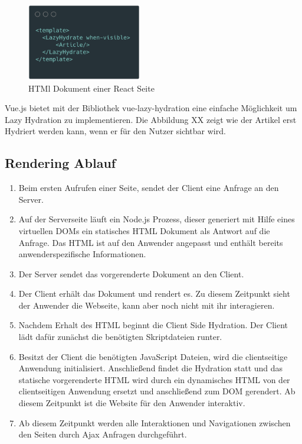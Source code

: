 \documentclass[runningheads]{llncs}
\begin{document}
\begin{figure}[h]
  \centering
  \includegraphics[width=5cm]{images/LazyHydration}
  \caption{HTMl Dokument einer React Seite}
\end{figure}
Vue.js bietet mit der Bibliothek vue-lazy-hydration 
eine einfache Möglichkeit um Lazy Hydration zu implementieren. 
Die Abbildung XX zeigt wie der Artikel erst Hydriert werden kann, 
wenn er für den Nutzer sichtbar wird.

\subsection{Rendering Ablauf}
\label{subsec:Rendering Ablauf}
\begin{enumerate}
  \item Beim ersten Aufrufen einer Seite, sendet der Client eine Anfrage an den Server.
  \item Auf der Serverseite läuft ein Node.js Prozess, 
  dieser generiert mit Hilfe eines virtuellen DOMs 
  ein statisches HTML Dokument als Antwort auf die Anfrage. 
  Das HTML ist auf den Anwender angepasst und enthält bereits anwenderspezifische Informationen.
  \item Der Server sendet das vorgerenderte Dokument an den Client.
  \item Der Client erhält das Dokument und rendert es. 
  Zu diesem Zeitpunkt sieht der Anwender die Webseite, 
  kann aber noch nicht mit ihr interagieren.
  \item Nachdem Erhalt des HTML beginnt die Client Side Hydration. 
  Der Client lädt dafür zunächst die benötigten Skriptdateien runter.
  \item Besitzt der Client die benötigten JavaScript Dateien, 
  wird die clientseitige Anwendung initialisiert. 
  Anschließend findet die Hydration statt und 
  das statische vorgerenderte HTML wird 
  durch ein dynamisches HTML von der clientseitigen Anwendung ersetzt und 
  anschließend zum DOM gerendert. 
  Ab diesem Zeitpunkt ist die Website für den Anwender interaktiv.
  \item Ab diesem Zeitpunkt werden alle Interaktionen und 
  Navigationen zwischen den Seiten durch Ajax Anfragen durchgeführt. 
\end{enumerate}
\end{document}

